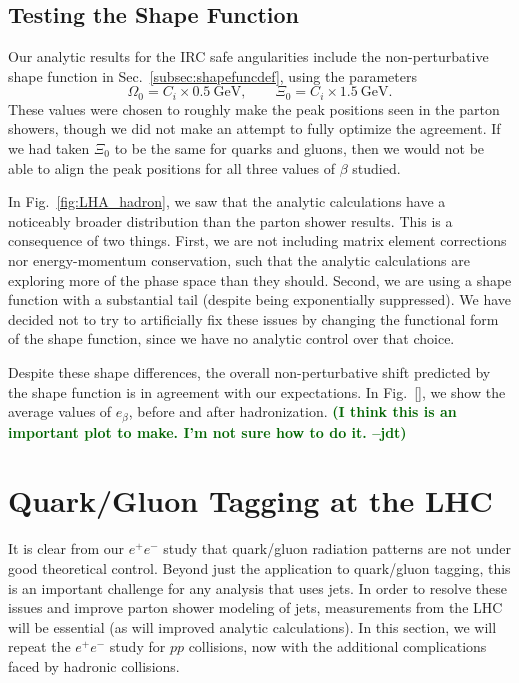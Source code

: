 \documentclass[11pt,letterpaper]{article}
\newcommand{\GeV}{\text{GeV}}
\DeclareRobustCommand{\Sec}[1]{Sec.~\ref{#1}}
\DeclareRobustCommand{\Fig}[1]{Fig.~\ref{#1}}
\newcommand{\be}{\begin{equation}}
\newcommand{\ee}{\end{equation}}
\newcommand{\jdt}[1]{\textbf{\textcolor{darkgreen}{(#1 --jdt)}}}
\begin{document}
\subsection{Testing the Shape Function}
\label{subsec:testingshape}

Our analytic results for the IRC safe angularities include the non-perturbative shape function in \Sec{subsec:shapefuncdef}, using the parameters
\be
\Omega_0 = C_i \times 0.5~\GeV, \qquad \Xi_0 = C_i \times 1.5~\GeV.
\ee
These values were chosen to roughly make the peak positions seen in the parton showers, though we did not make an attempt to fully optimize the agreement.  If we had taken $\Xi_0$ to be the same for quarks and gluons, then we would not be able to align the peak positions for all three values of $\beta$ studied.

In \Fig{fig:LHA_hadron}, we saw that the analytic calculations have a noticeably broader distribution than the parton shower results.  This is a consequence of two things.  First, we are not including matrix element corrections nor energy-momentum conservation, such that the analytic calculations are exploring more of the phase space than they should.    Second, we are using a shape function with a substantial tail (despite being exponentially suppressed).  We have decided not to try to artificially fix these issues by changing the functional form of the shape function, since we have no analytic control over that choice.   

Despite these shape differences, the overall non-perturbative shift predicted by the shape function is in agreement with our expectations.  In \Fig{}, we show the average values of $e_\beta$, before and after hadronization.  \jdt{I think this is an important plot to make.  I'm not sure how to do it.}

\clearpage


\section{Quark/Gluon Tagging at the LHC}
\label{sec:pp}

It is clear from our $e^+e^-$ study that quark/gluon radiation patterns are not under good theoretical control.  Beyond just the application to quark/gluon tagging, this is an important challenge for any analysis that uses jets.  In order to resolve these issues and improve parton shower modeling of jets, measurements from the LHC will be essential (as will improved analytic calculations).  In this section, we will repeat the $e^+e^-$ study for $pp$ collisions, now with the additional complications faced by hadronic collisions.
\end{document}
